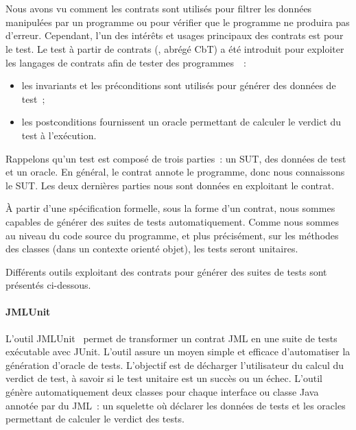 \section{}
\label{section:sota:cbt}

Nous avons vu comment les contrats sont utilisés pour {\strong filtrer} les
données manipulées par un programme ou pour vérifier que le programme ne
produira pas d'erreur. Cependant, l'un des intérêts et usages principaux des
contrats est pour le {\strong test}. Le {\strong test à partir de contrats}
(, abrégé CbT) a été introduit pour exploiter
les langages de contrats afin de tester des programmes~~:

\begin{itemize}

\item les invariants et les préconditions sont utilisés pour {\strong générer
des données} de test~;

\item les postconditions {\strong fournissent un oracle} permettant de calculer
le verdict du test à l'exécution.

\end{itemize}
%
Rappelons qu'un test est composé de trois parties~: un SUT, des données de test
et un oracle. En général, le contrat annote le programme, donc nous connaissons
le SUT. Les deux dernières parties nous sont données en exploitant le contrat.

À partir d'une spécification formelle, sous la forme d'un contrat, nous sommes
capables de générer des suites de tests automatiquement. Comme nous sommes au
niveau du code source du programme, et plus précisément, sur les méthodes des
classes (dans un contexte orienté objet), les tests seront {\strong unitaires}.

Différents outils exploitant des contrats pour générer des suites de tests sont
présentés ci-dessous.

\paragraph{JMLUnit} L'outil JMLUnit~ permet de
transformer un contrat JML en une suite de tests exécutable avec JUnit. L'outil
assure un moyen simple et efficace d'automatiser la génération d'oracle de
tests. L'objectif est de décharger l'utilisateur du calcul du verdict de test, à
savoir si le test unitaire est un succès ou un échec. L'outil génère
automatiquement deux classes pour chaque interface ou classe Java annotée par du
JML~: un squelette où déclarer les données de tests et les oracles permettant de
calculer le verdict des tests.

